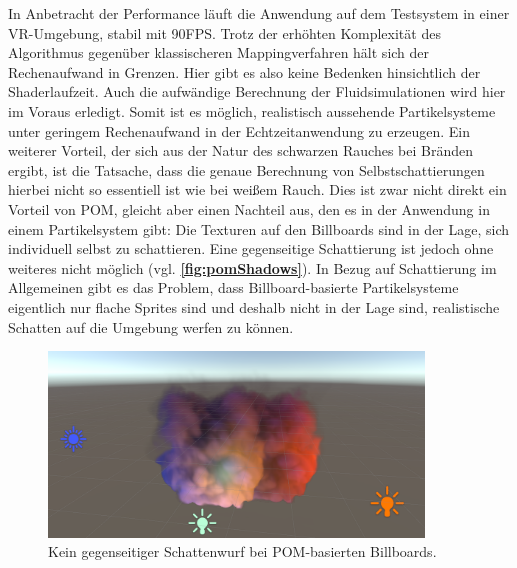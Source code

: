 In Anbetracht der Performance läuft die Anwendung auf dem Testsystem in einer VR-Umgebung, stabil mit 90FPS. Trotz der erhöhten Komplexität des Algorithmus gegenüber klassischeren 
Mappingverfahren hält sich der Rechenaufwand in Grenzen. Hier gibt es also keine Bedenken hinsichtlich der Shaderlaufzeit. Auch die aufwändige Berechnung der Fluidsimulationen wird hier im Voraus erledigt. 
Somit ist es möglich, realistisch aussehende Partikelsysteme unter geringem Rechenaufwand in der Echtzeitanwendung zu erzeugen. Ein weiterer Vorteil, der sich aus der Natur des schwarzen 
Rauches bei Bränden ergibt, ist die Tatsache, dass die genaue Berechnung von Selbstschattierungen hierbei nicht so essentiell ist wie bei weißem Rauch. Dies ist zwar nicht direkt ein Vorteil von POM, 
gleicht aber einen Nachteil aus, den es in der Anwendung in einem Partikelsystem gibt: Die Texturen auf den Billboards sind in der Lage, sich individuell selbst zu schattieren. 
Eine gegenseitige Schattierung ist jedoch ohne weiteres nicht möglich (vgl. \textbf{\autoref{fig:pomShadows}}). 
In Bezug auf Schattierung im Allgemeinen gibt es das Problem, dass Billboard-basierte Partikelsysteme eigentlich nur flache Sprites sind und deshalb nicht in der 
Lage sind, realistische Schatten auf die Umgebung werfen zu können. 



\begin{figure}[h!]
	\centering
	\includegraphics[width=0.89\textwidth]{Grafiken/Evaluation/pomShadows.png}
	\begin{footnotesize}
		\caption{Kein gegenseitiger Schattenwurf bei POM-basierten Billboards. }
		\label{fig:pomShadows}
	\end{footnotesize}
\end{figure}


